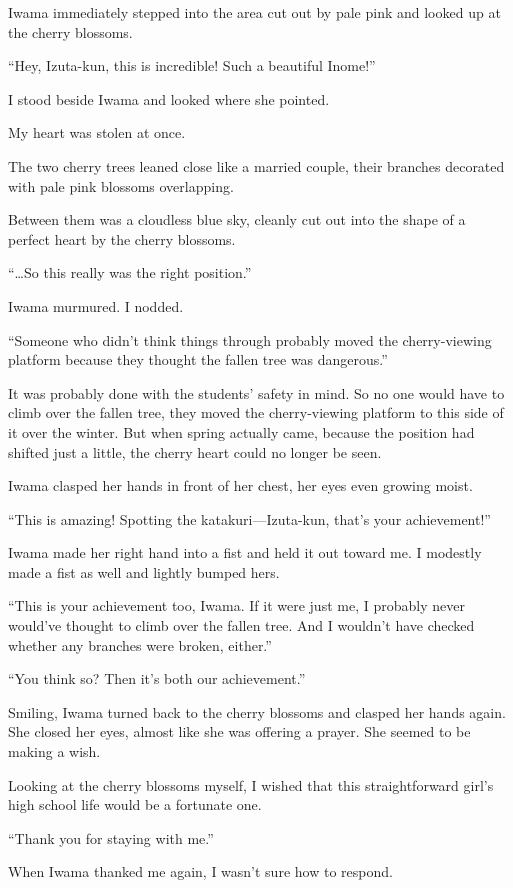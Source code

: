\documentclass[
    a4paper,
    12pt,
    twoside,
    openany,
    UTF8,
    fontset=windows
]{ctexbook}
\begin{document}
Iwama immediately stepped into the area cut out by pale pink and looked up at the cherry blossoms.

``Hey, Izuta-kun, this is incredible! Such a beautiful Inome!''

I stood beside Iwama and looked where she pointed.

My heart was stolen at once.

The two cherry trees leaned close like a married couple, their branches decorated with pale pink blossoms overlapping.

Between them was a cloudless blue sky, cleanly cut out into the shape of a perfect heart by the cherry blossoms.

``\dots So this really was the right position.''

Iwama murmured. I nodded.

``Someone who didn't think things through probably moved the cherry-viewing platform because they thought the fallen tree was dangerous.''

It was probably done with the students' safety in mind. So no one would have to climb over the fallen tree, they moved the cherry-viewing platform to this side of it over the winter. But when spring actually came, because the position had shifted just a little, the cherry heart could no longer be seen.

Iwama clasped her hands in front of her chest, her eyes even growing moist.

``This is amazing! Spotting the katakuri---Izuta-kun, that's your achievement!''

Iwama made her right hand into a fist and held it out toward me. I modestly made a fist as well and lightly bumped hers.

``This is your achievement too, Iwama. If it were just me, I probably never would've thought to climb over the fallen tree. And I wouldn't have checked whether any branches were broken, either.''

``You think so? Then it's both our achievement.''

Smiling, Iwama turned back to the cherry blossoms and clasped her hands again. She closed her eyes, almost like she was offering a prayer. She seemed to be making a wish.

Looking at the cherry blossoms myself, I wished that this straightforward girl's high school life would be a fortunate one.

``Thank you for staying with me.''

When Iwama thanked me again, I wasn't sure how to respond.
\end{document}
